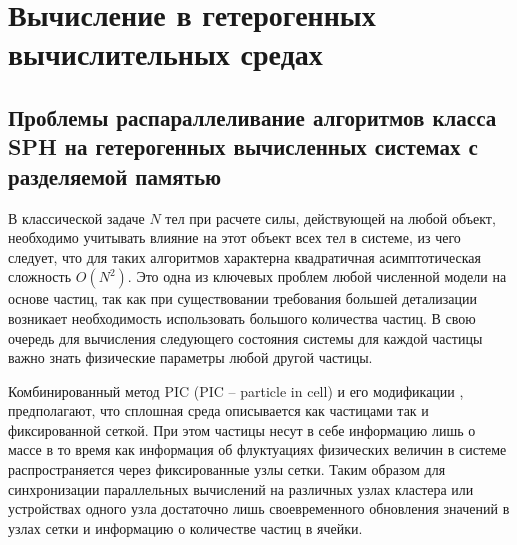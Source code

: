 \chapter{Вычисление в гетерогенных вычислительных средах}\label{ch:ch2}

\section{Проблемы распараллеливание алгоритмов класса SPH на гетерогенных вычисленных системах с разделяемой памятью}\label{sec:ch2/sec1}

В классической задаче \(N\) тел при расчете силы, действующей на любой объект, необходимо учитывать влияние на этот объект всех тел в системе, из чего следует, что для таких алгоритмов характерна квадратичная асимптотическая сложность \(O(N^2)\). Это одна из ключевых проблем любой численной модели на основе частиц, так как при существовании требования большей детализации возникает необходимость использовать большого количества частиц. В свою очередь для вычисления следующего состояния системы для каждой частицы важно знать физические параметры любой другой частицы. 

Комбинированный метод PIC (PIC – particle in cell) \cite{Harlow1963, Grigoriev2000, Belocherkovsky1982} и его модификации \cite{Belocherkovsky1982}, предполагают, что сплошная среда описывается как частицами так и фиксированной сеткой. При этом частицы несут в себе информацию лишь о массе в то время как информация об флуктуациях физических величин в системе распространяется через фиксированные узлы сетки. 
Таким образом для синхронизации параллельных вычислений на различных узлах кластера или устройствах одного узла достаточно лишь своевременного обновления значений в узлах сетки и информацию о количестве частиц в ячейки.

